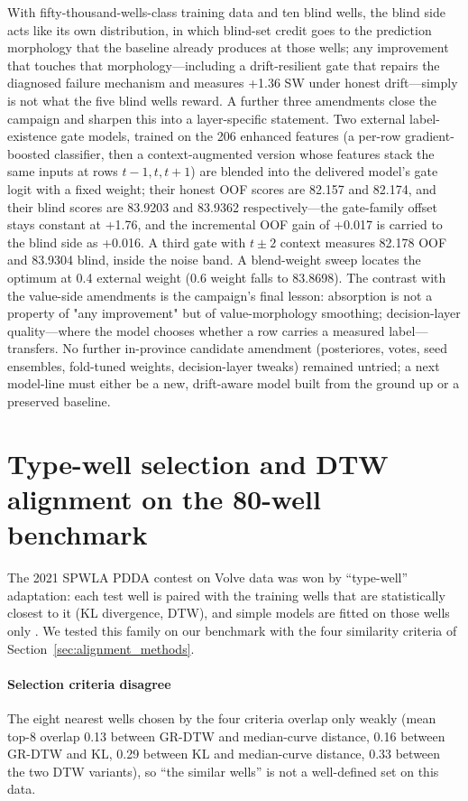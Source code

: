 \documentclass[preprint,12pt]{elsarticle}
\begin{document}
With fifty-thousand-wells-class training data and ten blind wells, the blind side acts like its own distribution, in which blind-set credit goes to the prediction morphology that the baseline already produces at those wells; any improvement that touches that morphology---including a drift-resilient gate that repairs the diagnosed failure mechanism and measures +1.36 SW under honest drift---simply is not what the five blind wells reward. A further three amendments close the campaign and sharpen this into a layer-specific statement. Two external label-existence gate models, trained on the 206 enhanced features (a per-row gradient-boosted classifier, then a context-augmented version whose features stack the same inputs at rows $t-1,t,t+1$) are blended into the delivered model's gate logit with a fixed weight; their honest OOF scores are 82.157 and 82.174, and their blind scores are 83.9203 and 83.9362 respectively---the gate-family offset stays constant at +1.76, and the incremental OOF gain of +0.017 is carried to the blind side as +0.016. A third gate with $t\pm2$ context measures 82.178 OOF and 83.9304 blind, inside the noise band. A blend-weight sweep locates the optimum at 0.4 external weight (0.6 weight falls to 83.8698). The contrast with the value-side amendments is the campaign's final lesson: absorption is not a property of "any improvement" but of value-morphology smoothing; decision-layer quality---where the model chooses whether a row carries a measured label---transfers. No further in-province candidate amendment (posteriores, votes, seed ensembles, fold-tuned weights, decision-layer tweaks) remained untried; a next model-line must either be a new, drift-aware model built from the ground up or a preserved baseline.

\section{Type-well selection and DTW alignment on the 80-well benchmark}
\label{sec:typewell}

The 2021 SPWLA PDDA contest on Volve data was won by ``type-well'' adaptation: each test well is paired with the training wells that are statistically closest to it (KL divergence, DTW), and simple models are fitted on those wells only \cite{fu2024contest}. We tested this family on our benchmark with the four similarity criteria of Section~\ref{sec:alignment_methods}.

\paragraph{Selection criteria disagree} The eight nearest wells chosen by the four criteria overlap only weakly (mean top-8 overlap 0.13 between GR-DTW and median-curve distance, 0.16 between GR-DTW and KL, 0.29 between KL and median-curve distance, 0.33 between the two DTW variants), so ``the similar wells'' is not a well-defined set on this data.
\end{document}
